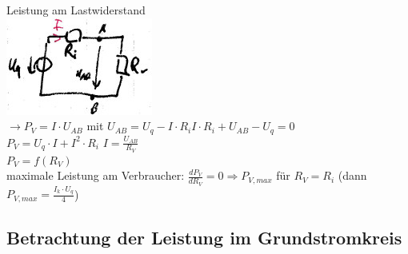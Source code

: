 Leistung am Lastwiderstand\\
\includegraphics[scale=1.5]{Abbildungen/ABB313}\\
$\rightarrow P_V = I\cdot U_{AB}$ \quad mit $U_{AB}=U_q-I\cdot R_i$\quad $I\cdot R_i + U_{AB}-U_q=0$\\
$P_V=U_q\cdot I + I^2 \cdot R_i$ \quad $I=\frac{U_{AB}}{R_V}$\\
$P_V=f(R_V)$\\
maximale Leistung am Verbraucher: $\frac{d P_V}{dR_V}=0 \Rightarrow P_{V,max}$ für $R_V=R_i$ (dann $P_{V,max}=\frac{I_k \cdot U_q}{4}$)

\subsection{Betrachtung der Leistung im Grundstromkreis}

